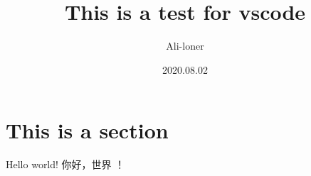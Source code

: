 \documentclass[a4paper]{article}
\title{\heiti\zihao{2} This is a test for vscode}
\author{\songti Ali-loner}
\date{2020.08.02}
\begin{document}
    \maketitle
\begin{abstract}
    \lipsum[2]
\end{abstract}
\tableofcontents
\section{This is a section}

Hello world! 你好，世界 ！
\end{document}

